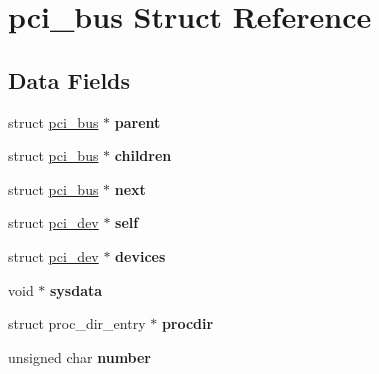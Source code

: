 \hypertarget{structpci__bus}{}\section{pci\+\_\+bus Struct Reference}
\label{structpci__bus}
\subsection*{Data Fields}
\begin{DoxyCompactItemize}
\item 
\mbox{\label{structpci__bus_a81ea21e28d2c2825e229159135281853}} 
struct \mbox{\hyperlink{structpci__bus}{pci\+\_\+bus}} $\ast$ {\bfseries parent}
\item 
\mbox{\label{structpci__bus_a080d85eb2f59df6df80fc15434ac681d}} 
struct \mbox{\hyperlink{structpci__bus}{pci\+\_\+bus}} $\ast$ {\bfseries children}
\item 
\mbox{\label{structpci__bus_ab7e897663a4ba7ad22dc1b329eb6666a}} 
struct \mbox{\hyperlink{structpci__bus}{pci\+\_\+bus}} $\ast$ {\bfseries next}
\item 
\mbox{\label{structpci__bus_ad98cb681ede4c82c95d69f28ae5463bc}} 
struct \mbox{\hyperlink{structpci__dev}{pci\+\_\+dev}} $\ast$ {\bfseries self}
\item 
\mbox{\label{structpci__bus_ad0bbcd02085de85e9e3581f35300b30f}} 
struct \mbox{\hyperlink{structpci__dev}{pci\+\_\+dev}} $\ast$ {\bfseries devices}
\item 
\mbox{\label{structpci__bus_af2d1a1d34f651fae9f97be53fb7cc87e}} 
void $\ast$ {\bfseries sysdata}
\item 
\mbox{\label{structpci__bus_a957670cff9446c105c461b884f6285d5}} 
struct proc\+\_\+dir\+\_\+entry $\ast$ {\bfseries procdir}
\item 
\mbox{\label{structpci__bus_a314e064b9d5358f57926452f4bb4cf2a}} 
unsigned char {\bfseries number}
\item 
\mbox{\label{structpci__bus_abadd5e790c1dcbeff5a7fcffafbcee3a}} 

\end{DoxyCompactItemize}
